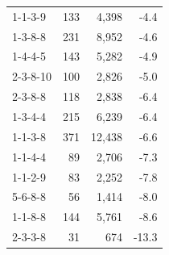 \begin{tabular}{lrrr}
1-1-3-9 & 133 & 4,398 & -4.4 \\
1-3-8-8 & 231 & 8,952 & -4.6 \\
1-4-4-5 & 143 & 5,282 & -4.9 \\
2-3-8-10 & 100 & 2,826 & -5.0 \\
2-3-8-8 & 118 & 2,838 & -6.4 \\
1-3-4-4 & 215 & 6,239 & -6.4 \\
1-1-3-8 & 371 & 12,438 & -6.6 \\
1-1-4-4 & 89 & 2,706 & -7.3 \\
1-1-2-9 & 83 & 2,252 & -7.8 \\
5-6-8-8 & 56 & 1,414 & -8.0 \\
1-1-8-8 & 144 & 5,761 & -8.6 \\
2-3-3-8 & 31 & 674 & -13.3 \\
\end{tabular}
